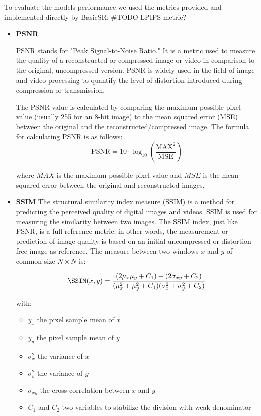 To evaluate the models performance we used the metrics provided and implemented directly by BasicSR:
\#TODO LPIPS metric?
\begin{itemize}
  \item \textbf{PSNR}\newline

  PSNR\cite{psnr} stands for "Peak Signal-to-Noise Ratio." It is a metric used to measure the quality of a reconstructed or compressed image or video in comparison to the original, uncompressed version. PSNR is widely used in the field of image and video processing to quantify the level of distortion introduced during compression or transmission.

  The PSNR value is calculated by comparing the maximum possible pixel value (usually 255 for an 8-bit image) to the mean squared error (MSE) between the original and the reconstructed/compressed image. The formula for calculating PSNR is as follows:
  \[
  \text{PSNR} = 10 \cdot \log_{10}\left(\frac{\text{MAX}^2}{\text{MSE}}\right)
  \]

  where \(MAX\) is the maximum possible pixel value and \(MSE\) is the mean squared error between the original and reconstructed images.


  \item \textbf{SSIM}\newline
  The structural similarity index measure (SSIM) is a method for predicting the perceived quality of digital images and videos. SSIM is used for measuring the similarity between two images. The SSIM index, just like PSNR, is a full reference metric; in other words, the measurement or prediction of image quality is based on an initial uncompressed or distortion-free image as reference. The measure between two windows \(x\) and \(y\) of common size \(N \times N\) is:


  \begin{equation}
    \SSIM(x,y) = \frac{(2\mu_x\mu_y + C_1) + (2 \sigma _{xy} + C_2)}
      {(\mu_x^2 + \mu_y^2+C_1) (\sigma_x^2 + \sigma_y^2+C_2)}
    \label{eq:SSMI}
  \end{equation}

  with:
  \begin{itemize}
    \itemsep0em
    \item \(y_x\) the pixel sample mean of \(x\)
    \item \(y_y\) the pixel sample mean of \(y\)
    \item \(\sigma_x^2\) the variance of \(x\)
    \item \(\sigma_y^2\) the variance of \(y\)
    \item \(\sigma _{xy}\) the cross-correlation between \(x\) and \(y\)
    \item \(C_1\) and \(C_2\) two variables to stabilize the division with weak denominator
  \end{itemize}
  \end{itemize}

